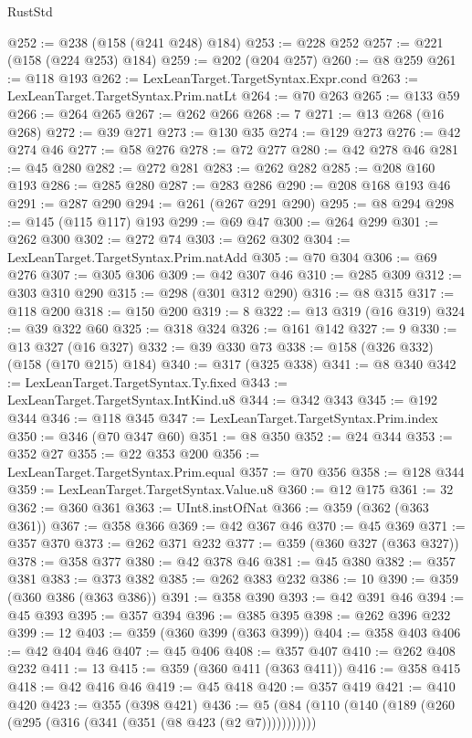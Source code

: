 \begin{lexlean}{RustStd}
\begin{coremodule}
{\begin{coremodule}
{{{{{{{{{{{{{{@252 := @238 (@158 (@241 @248) @184)
@253 := @228 @252
@257 := @221 (@158 (@224 @253) @184)
@259 := @202 (@204 @257)
@260 := @8 @259
@261 := @118 @193
@262 := LexLeanTarget.TargetSyntax.Expr.cond
@263 := LexLeanTarget.TargetSyntax.Prim.natLt
@264 := @70 @263
@265 := @133 @59
@266 := @264 @265
@267 := @262 @266
@268 := 7
@271 := @13 @268 (@16 @268)
@272 := @39 @271
@273 := @130 @35
@274 := @129 @273
@276 := @42 @274 @46
@277 := @58 @276
@278 := @72 @277
@280 := @42 @278 @46
@281 := @45 @280
@282 := @272 @281
@283 := @262 @282
@285 := @208 @160 @193
@286 := @285 @280
@287 := @283 @286
@290 := @208 @168 @193 @46
@291 := @287 @290
@294 := @261 (@267 @291 @290)
@295 := @8 @294
@298 := @145 (@115 @117) @193
@299 := @69 @47
@300 := @264 @299
@301 := @262 @300
@302 := @272 @74
@303 := @262 @302
@304 := LexLeanTarget.TargetSyntax.Prim.natAdd
@305 := @70 @304
@306 := @69 @276
@307 := @305 @306
@309 := @42 @307 @46
@310 := @285 @309
@312 := @303 @310 @290
@315 := @298 (@301 @312 @290)
@316 := @8 @315
@317 := @118 @200
@318 := @150 @200
@319 := 8
@322 := @13 @319 (@16 @319)
@324 := @39 @322 @60
@325 := @318 @324
@326 := @161 @142
@327 := 9
@330 := @13 @327 (@16 @327)
@332 := @39 @330 @73
@338 := @158 (@326 @332) (@158 (@170 @215) @184)
@340 := @317 (@325 @338)
@341 := @8 @340
@342 := LexLeanTarget.TargetSyntax.Ty.fixed
@343 := LexLeanTarget.TargetSyntax.IntKind.u8
@344 := @342 @343
@345 := @192 @344
@346 := @118 @345
@347 := LexLeanTarget.TargetSyntax.Prim.index
@350 := @346 (@70 @347 @60)
@351 := @8 @350
@352 := @24 @344
@353 := @352 @27
@355 := @22 @353 @200
@356 := LexLeanTarget.TargetSyntax.Prim.equal
@357 := @70 @356
@358 := @128 @344
@359 := LexLeanTarget.TargetSyntax.Value.u8
@360 := @12 @175
@361 := 32
@362 := @360 @361
@363 := UInt8.instOfNat
@366 := @359 (@362 (@363 @361))
@367 := @358 @366
@369 := @42 @367 @46
@370 := @45 @369
@371 := @357 @370
@373 := @262 @371 @232
@377 := @359 (@360 @327 (@363 @327))
@378 := @358 @377
@380 := @42 @378 @46
@381 := @45 @380
@382 := @357 @381
@383 := @373 @382
@385 := @262 @383 @232
@386 := 10
@390 := @359 (@360 @386 (@363 @386))
@391 := @358 @390
@393 := @42 @391 @46
@394 := @45 @393
@395 := @357 @394
@396 := @385 @395
@398 := @262 @396 @232
@399 := 12
@403 := @359 (@360 @399 (@363 @399))
@404 := @358 @403
@406 := @42 @404 @46
@407 := @45 @406
@408 := @357 @407
@410 := @262 @408 @232
@411 := 13
@415 := @359 (@360 @411 (@363 @411))
@416 := @358 @415
@418 := @42 @416 @46
@419 := @45 @418
@420 := @357 @419
@421 := @410 @420
@423 := @355 (@398 @421)
@436 := @5 (@84 (@110 (@140 (@189 (@260 (@295 (@316 (@341 (@351 (@8 @423 (@2 @7)))))))))))
}}}}}}}}}}}}}}
\end{coremodule}}
\end{coremodule}
\end{lexlean}

